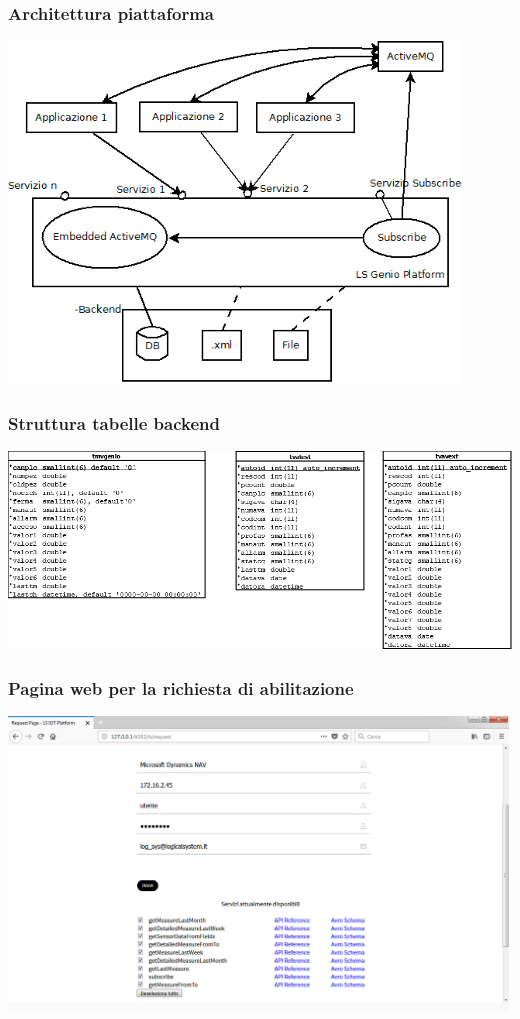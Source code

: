 \documentclass{beamer}
\begin{document}
\begin{frame}
\frametitle{Architettura piattaforma}
\includegraphics[width=0.9\textwidth]{images/architettura_piattaforma.png}
\end{frame}

\begin{frame}
\frametitle{Struttura tabelle backend}
\includegraphics[width=1\textwidth]{images/tabelle-backend.png}
\end{frame}

\begin{frame}
\frametitle{Pagina web per la richiesta di abilitazione}
\includegraphics[width=1\textwidth]{images/RequestPagePlatform.png}
\end{frame}
\end{document}
